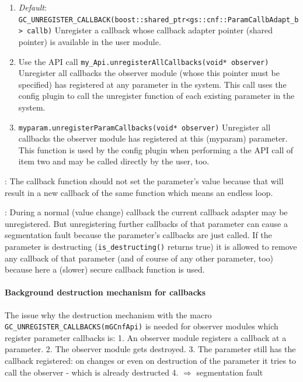 \begin{enumerate}
  \item {\em Default}: \newline
  \lstinline|GC_UNREGISTER_CALLBACK(boost::shared_ptr<gs::cnf::ParamCallbAdapt_b> callb)| \newline
Unregister a callback whose callback adapter pointer (shared pointer) is available in the user module.
  \item Use the \GreenConfig API call \lstinline|my_Api.unregisterAllCallbacks(void* observer)| \newline
Unregister all callbacks the observer module (whose this pointer must be specified) has registered at any parameter in the system. This call uses the config plugin to call the unregister function of each existing parameter in the system.
  \item \lstinline|myparam.unregisterParamCallbacks(void* observer)| \newline
Unregister all callbacks the observer module has registered at this (myparam) parameter.
This function is used by the config plugin when performing a the API call of item two and may be called directly by the user, too.
\end{enumerate}

: The callback function should not set the parameter's value because that will result in a new callback of the same function which means an endless loop.

: During a normal (value change) callback the current callback adapter may be unregistered. But unregistering further callbacks of that parameter can cause a segmentation fault because the parameter's callbacks are just called. If the parameter is destructing  (\lstinline|is_destructing()| returns true) it is allowed to remove any callback of that parameter (and of course of any other parameter, too) because here a (slower) secure callback function is used.

\paragraph{Background destruction mechanism for callbacks}
The issue why the destruction mechanism with the macro \lstinline|GC_UNREGISTER_CALLBACKS(mGCnfApi)| is needed for observer modules which register parameter callbacks is: 1. An observer module registers a callback at a parameter. 2. The observer module gets destroyed. 3. The parameter still has the callback registered: on changes or even on destruction of the parameter it tries to call the observer - which is already destructed 4. $\Rightarrow$ segmentation fault

